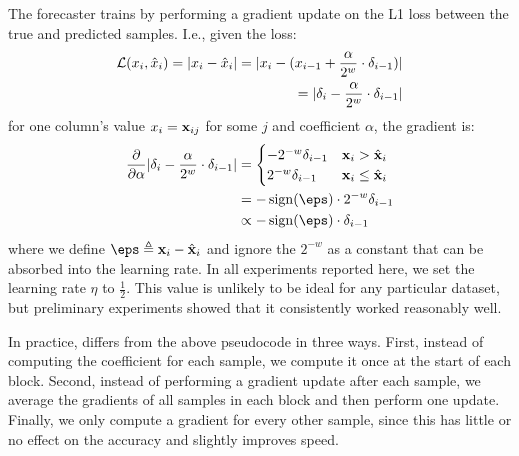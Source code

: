 The forecaster trains by performing a gradient update on the L1 loss between the true and predicted samples. I.e., given the loss:
\begin{align}
    \mathcal{L}(x_i, \hat{x}_{i}) = \lvert x_i - \hat{x}_i\rvert
    = \lvert x_i - (x_{i-1} + \frac{\alpha}{2^w} \cdot \delta_{i-1})\rvert \\
    = \lvert\delta_{i} - \frac{\alpha}{2^w} \cdot \delta_{i-1}\rvert
\end{align}
for one column's value $x_i = \mathbf{x}_{ij}$ for some $j$ and coefficient $\alpha$, the gradient is:
\begin{align}
        \frac{\partial }{\partial \alpha} \abs{\delta_{i} - \frac{\alpha}{2^w} \cdot \delta_{i-1}}
&= \begin{cases}
        -{2^{-w}}\vdelta_{i-1} & \x_{i} > \hat{\x}_{i} \\
        {2^{-w}}\vdelta_{i-1} & \x_{i} \le \hat{\x}_{i}
\end{cases} \\
&= -\sign(\eps) \cdot {2^{-w}}\vdelta_{i-1} \\
&\propto -\sign(\eps) \cdot \vdelta_{i-1}
\end{align}
where we define $\eps \triangleq \x_{i} - \hat{\x}_{i}$ and ignore the $2^{-w}$ as a constant that can be absorbed into the learning rate. In all experiments reported here, we set the learning rate $\eta$ to $\frac{1}{2}$. This value is unlikely to be ideal for any particular dataset, but preliminary experiments showed that it consistently worked reasonably well. %

In practice, \fire differs from the above pseudocode in three ways. First, instead of computing the coefficient for each sample, we compute it once at the start of each block. Second, instead of performing a gradient update after each sample, we average the gradients of all samples in each block and then perform one update. Finally, we only compute a gradient for every other sample, since this has little or no effect on the accuracy and slightly improves speed.

